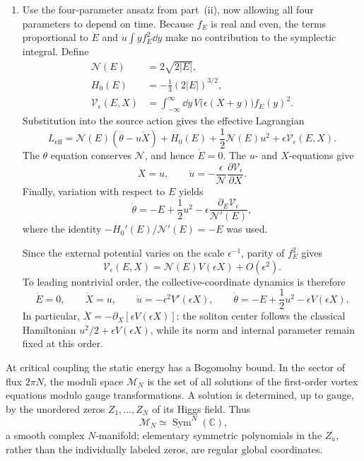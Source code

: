 \begin{enumerate}
\begin{enumerate}
    \item[(iv)]
    Use the four-parameter ansatz from part~(ii), now allowing all four
    parameters to depend on time.  Because \(f_E\) is real and even,
    the terms proportional to \(\dot E\) and
    \(\dot u\int y f_E^2\dd y\) make no contribution to the symplectic
    integral.  Define
    \[
    \begin{split}
      \mathcal N(E)&=2\sqrt{2|E|},\\
      H_0(E)&=-\frac13(2|E|)^{3/2},\\
      \mathcal V_\epsilon(E,X)
        &=\int_{-\infty}^{\infty}\dd y\,
          V\bigl(\epsilon(X+y)\bigr)f_E(y)^2.
    \end{split}
    \]
    Substitution into the source action gives the effective Lagrangian
    \[
      \boxed{L_{\mathrm{eff}}
        =\mathcal N(E)(\dot\theta-u\dot X)
         +H_0(E)+\frac12\mathcal N(E)u^2
         +\epsilon\mathcal V_\epsilon(E,X).}
    \]
    The \(\theta\) equation conserves \(\mathcal N\), and hence
    \(\dot E=0\).  The \(u\)- and \(X\)-equations give
    \[
      \boxed{\dot X=u,\qquad
        \dot u=-\frac{\epsilon}{\mathcal N}
          \frac{\partial\mathcal V_\epsilon}{\partial X}.}
    \]
    Finally, variation with respect to \(E\) yields
    \[
      \boxed{\dot\theta=-E+\frac12u^2
        -\epsilon\frac{\partial_E\mathcal V_\epsilon}
          {\mathcal N'(E)},}
    \]
    where the identity
    \(-H_0'(E)/\mathcal N'(E)=-E\) was used.

    Since the external potential varies on the scale \(\epsilon^{-1}\),
    parity of \(f_E^2\) gives
    \[
      \mathcal V_\epsilon(E,X)
        =\mathcal N(E)V(\epsilon X)+O(\epsilon^2).
    \]
    To leading nontrivial order, the collective-coordinate dynamics is
    therefore
    \[
      \boxed{\dot E=0,\qquad \dot X=u,\qquad
        \dot u=-\epsilon^2V'(\epsilon X),\qquad
        \dot\theta=-E+\frac12u^2-\epsilon V(\epsilon X).}
    \]
    In particular,
    \(\ddot X=-\partial_X[\epsilon V(\epsilon X)]\): the soliton center
    follows the classical Hamiltonian
    \(u^2/2+\epsilon V(\epsilon X)\), while its norm and internal
    parameter remain fixed at this order.
  \end{enumerate}

  At critical coupling the static energy has a Bogomolny bound.  In the
  sector of flux \(2\pi N\), the moduli space \(\mathcal M_N\) is the set
  of all solutions of the first-order vortex equations modulo gauge
  transformations.  A solution is determined, up to gauge, by the
  unordered zeros \(Z_1,\ldots,Z_N\) of its Higgs field.  Thus
  \[
    \mathcal M_N\simeq\operatorname{Sym}^N(\mathbb C),
  \]
  a smooth complex \(N\)-manifold; elementary symmetric polynomials in
  the \(Z_a\), rather than the individually labeled zeros, are regular
  global coordinates.


\end{enumerate}
